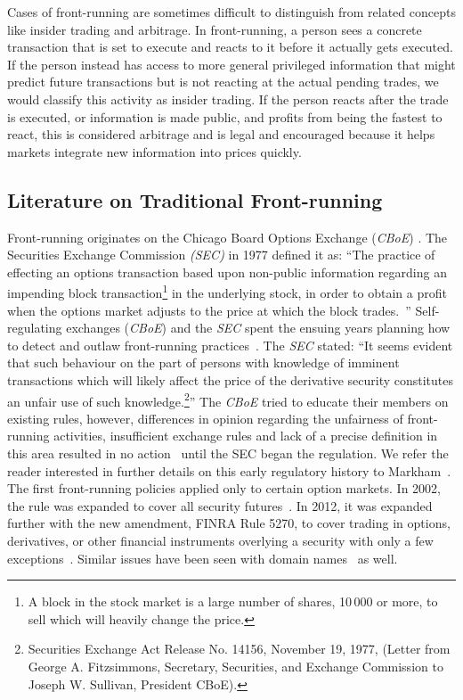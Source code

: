 Cases of front-running are sometimes difficult to distinguish from related concepts like insider trading and arbitrage. In front-running, a person sees a concrete transaction that is set to execute and reacts to it before it actually gets executed. If the person instead has access to more general privileged information that might predict future transactions but is not reacting at the actual pending trades, we would classify this activity as insider trading. If the person reacts after the trade is executed, or information is made public, and profits from being the fastest to react, this is considered arbitrage and is legal and encouraged because it helps markets integrate new information into prices quickly.

\subsection{Literature on Traditional Front-running}\label{traditionalFrontrunning}
Front-running originates on the Chicago Board Options Exchange (\textit{CBoE}) \cite{markham1988front}. The Securities Exchange Commission \textit{(SEC)} in 1977 defined it as: ``The practice of effecting an options transaction based upon non-public information regarding an impending block transaction\footnote{A block in the stock market is a large number of shares, 10\,000 or more, to sell which will heavily change the price.} in the underlying stock, in order to obtain a profit when the options market adjusts to the price at which the block trades.~\cite{sec1978optionsmarket}'' Self-regulating exchanges (\eg \textit{CBoE}) and the \textit{SEC} spent the ensuing years planning how to detect and outlaw front-running practices~\cite{markham1988front}. The \textit{SEC} stated: ``It seems evident that such behaviour on the part of persons with knowledge of imminent transactions which will likely affect the price of the derivative security constitutes an unfair use of such knowledge.\footnote{Securities Exchange Act Release No. 14156, November 19, 1977, (Letter from George A. Fitzsimmons, Secretary, Securities, and Exchange Commission to Joseph W. Sullivan, President  CBoE).}'' The \textit{CBoE} tried to educate their members on existing rules, however, differences in opinion regarding the unfairness of front-running activities, insufficient exchange rules and lack of a precise definition in this area resulted in no action~\cite{sec1978optionsmarket} until the SEC began the regulation. We refer the reader interested in further details on this early regulatory history to Markham~\cite{markham1988front}. The first front-running policies applied only to certain option markets. In 2002, the rule was expanded to cover all security futures~\cite{finra_2002}. In 2012, it was expanded further with the new amendment, FINRA Rule 5270, to cover trading in options, derivatives, or other financial instruments overlying a security with only a few exceptions~\cite{sec2012frontrunning,finra_2012}. Similar issues have been seen with domain names~\cite{sac022en33:online,edelman2009front} as well.


